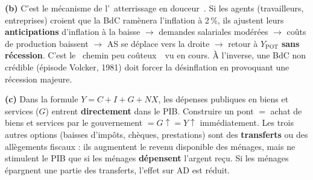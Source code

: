 \begin{reponse}
\textbf{(b)} C'est le mécanisme de l'\guillemotleft~atterrissage en douceur~\guillemotright. Si les agents (travailleurs, entreprises) croient que la BdC ramènera l'inflation à 2\,\%, ils ajustent leurs \textbf{anticipations} d'inflation à la baisse $\to$ demandes salariales modérées $\to$ coûts de production baissent $\to$ AS se déplace vers la droite $\to$ retour à $Y_{\text{POT}}$ \textbf{sans récession}. C'est le \guillemotleft~chemin peu coûteux~\guillemotright\ vu en cours. À l'inverse, une BdC non crédible (épisode Volcker, 1981) doit forcer la désinflation en provoquant une récession majeure.
\end{reponse}



\begin{reponse}
\textbf{(c)} Dans la formule $Y = C + I + G + NX$, les dépenses publiques en biens et services ($G$) entrent \textbf{directement} dans le PIB. Construire un pont $=$ achat de biens et services par le gouvernement $= G \uparrow = Y \uparrow$ immédiatement. Les trois autres options (baisses d'impôts, chèques, prestations) sont des \textbf{transferts} ou des allègements fiscaux : ils augmentent le revenu disponible des ménages, mais ne stimulent le PIB que si les ménages \textbf{dépensent} l'argent reçu. Si les ménages épargnent une partie des transferts, l'effet sur AD est réduit.
\end{reponse}


